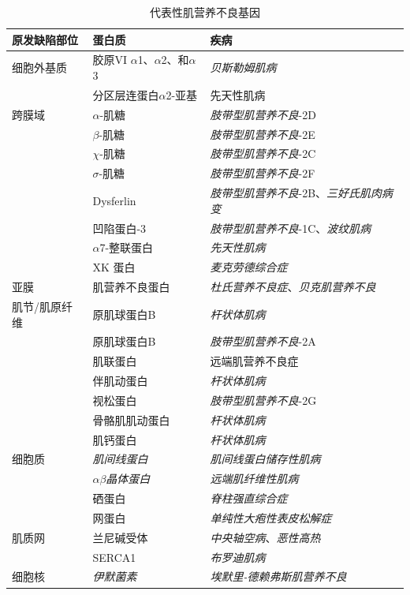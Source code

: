 \begin{table}[htbp]
	\caption{代表性肌营养不良基因} \label{tab:57_4} \centering
	\begin{tabular}{lll}
		\toprule
		原发缺陷部位 & 蛋白质 & 疾病 \\
		\midrule
		细胞外基质 & 胶原VI $\alpha$1、$\alpha$2、和$\alpha$3 & \textit{贝斯勒姆肌病} \\
		 & 分区层连蛋白$\alpha$2-亚基 & 先天性肌病 \\
		跨膜域 & $\alpha$-肌糖 & \textit{肢带型肌营养不良}-2D \\
		 & $\beta$-肌糖 & \textit{肢带型肌营养不良}-2E \\
		 & $\chi$-肌糖 & \textit{肢带型肌营养不良}-2C \\
		 & $\sigma$-肌糖 & \textit{肢带型肌营养不良}-2F \\
		 & Dysferlin & \textit{肢带型肌营养不良}-2B、\textit{三好氏肌肉病变} \\
		 & 凹陷蛋白-3 & \textit{肢带型肌营养不良}-1C、\textit{波纹肌病} \\
		 & $\alpha$7-整联蛋白 & \textit{先天性肌病} \\
		 & XK 蛋白 & \textit{麦克劳德综合症} \\
		亚膜 & 肌营养不良蛋白 & \textit{杜氏营养不良症}、\textit{贝克肌营养不良} \\
		肌节/肌原纤维 & 原肌球蛋白B & \textit{杆状体肌病} \\
		 & 原肌球蛋白B & \textit{肢带型肌营养不良}-2A \\
		 & 肌联蛋白 & 远端肌营养不良症 \\
		 & 伴肌动蛋白 & \textit{杆状体肌病} \\
		 & 视松蛋白 & \textit{肢带型肌营养不良}-2G \\
		 & 骨骼肌肌动蛋白 & \textit{杆状体肌病} \\
		 & 肌钙蛋白 & \textit{杆状体肌病} \\
		细胞质 & \textit{肌间线蛋白} & \textit{肌间线蛋白储存性肌病} \\
		 & $\alpha \beta$\textit{晶体蛋白} & \textit{远端肌纤维性肌病} \\
		 & 硒蛋白 & \textit{脊柱强直综合症} \\
		 & 网蛋白 & \textit{单纯性大疱性表皮松解症} \\
		肌质网 & 兰尼碱受体 & \textit{中央轴空病}、\textit{恶性高热} \\
		 & SERCA1 & \textit{布罗迪肌病} \\
		细胞核 & \textit{伊默菌素} & \textit{埃默里-德赖弗斯肌营养不良} \\

\end{tabular}
\end{table}
